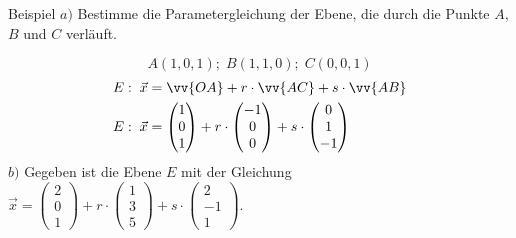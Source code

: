 \documentclass{article}
\begin{document}
\begin{boxx}[DarkBlue]{Beispiel}
    $a)$\hspace{3mm} Bestimme die Parametergleichung der Ebene, die durch die Punkte
    $A$, $B$ und $C$ verläuft.

    \[A(1,0,1);\; B(1,1,0);\; C(0,0,1)\]
    \begin{align*}
        E:\; \vec{x} &= \vv{OA} + r \cdot \vv{AC} + s \cdot \vv{AB} \\
        E:\; \vec{x} &= \begin{pmatrix}1\\0\\1\end{pmatrix} + r \cdot \begin{pmatrix}-1\\0\\0\end{pmatrix} + s \cdot \begin{pmatrix}0\\1\\-1\end{pmatrix} \\
    \end{align*}
    $b)$\hspace{3mm} Gegeben ist die Ebene $E$ mit der Gleichung 
    $\displaystyle \vec{x} = \begin{pmatrix}2\\0\\1\end{pmatrix} + r \cdot \begin{pmatrix}1\\3\\5\end{pmatrix} + s \cdot \begin{pmatrix}2\\-1\\1\end{pmatrix}$.\\


\end{boxx}
\end{document}
